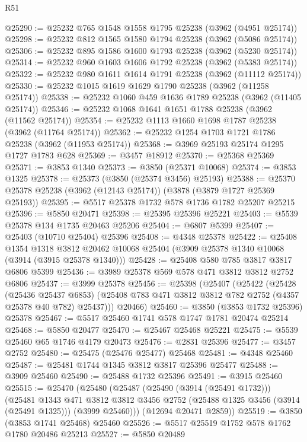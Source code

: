 \begin{lexlean}{R51}
\begin{coremodule}
@25290 := @25232 @765 @1548 @1558 @1795 @25238 (@3962 (@4951 @25174))
@25298 := @25232 @812 @1565 @1580 @1794 @25238 (@3962 (@5086 @25174))
@25306 := @25232 @895 @1586 @1600 @1793 @25238 (@3962 (@5230 @25174))
@25314 := @25232 @960 @1603 @1606 @1792 @25238 (@3962 (@5383 @25174))
@25322 := @25232 @980 @1611 @1614 @1791 @25238 (@3962 (@11112 @25174))
@25330 := @25232 @1015 @1619 @1629 @1790 @25238 (@3962 (@11258 @25174))
@25338 := @25232 @1060 @459 @1636 @1789 @25238 (@3962 (@11405 @25174))
@25346 := @25232 @1068 @1641 @1651 @1788 @25238 (@3962 (@11562 @25174))
@25354 := @25232 @1113 @1660 @1698 @1787 @25238 (@3962 (@11764 @25174))
@25362 := @25232 @1254 @1703 @1721 @1786 @25238 (@3962 (@11953 @25174))
@25368 := @3969 @25193 @25174 @1295 @1727 @1783 @628
@25369 := @3457 @18912
@25370 := @25368 @25369
@25371 := @3853 @1340
@25373 := @3850 (@25371 @10068)
@25374 := @3853 @1325
@25378 := @25373 (@3850 (@25374 @3456) @25193)
@25388 := @25370 @25378 @25238 (@3962 (@12143 @25174)) (@3878 (@3879 @1727 @25369 @25193))
@25395 := @5517 @25378 @1732 @578 @1736 @1782 @25207 @25215
@25396 := @5850 @20471
@25398 := @25395 @25396 @25221
@25403 := @5539 @25378 @134 @1735 @20463 @25206
@25404 := @6807 @5399
@25407 := @25403 (@10710 @25404) @25396
@25408 := @4348 @25378
@25422 := @25408
    @1354
    @1318
    @3812
    @20462
    @10068
    @25404
    (@3909 @25378 @1340 @10068 (@3914 (@3915 @25378 @1340)))
@25428 := @25408 @580 @785 @3817 @3817 @6806 @5399
@25436 := @3989 @25378 @569 @578 @471 @3812 @3812 @2752 @6806
@25437 := @3999 @25378
@25456 := @25398
    (@25407
      (@25422
        (@25428
          (@25436 @25437 @6853)
          (@25408 @783 @471 @3812 @3812 @782 @2752 (@4357 @25378 @40 @782) @25437)))
      @20466)
@25460 := @3850 (@3853 @1732 @25396) @25378
@25467 := @5517 @25460 @1741 @578 @1747 @1781 @20474 @25214
@25468 := @5850 @20477
@25470 := @25467 @25468 @25221
@25475 := @5539 @25460 @65 @1746 @4179 @20473
@25476 := @2831 @25396
@25477 := @3457 @2752
@25480 := @25475 (@25476 @25477) @25468
@25481 := @4348 @25460
@25487 := @25481 @1744 @1345 @3812 @3817 @25396 @25477
@25488 := @3909 @25460
@25490 := @25488 @1732 @25396
@25491 := @3915 @25460
@25515 := @25470
    (@25480
      (@25487
        (@25490 (@3914 (@25491 @1732)))
        (@25481
          @1343
          @471
          @3812
          @3812
          @3456
          @2752
          (@25488 @1325 @3456 (@3914 (@25491 @1325)))
          (@3999 @25460)))
      (@12694 @20471 @2859))
@25519 := @3850 (@3853 @1741 @25468) @25460
@25526 := @5517 @25519 @1752 @578 @1762 @1780 @20486 @25213
@25527 := @5850 @20489

\end{coremodule}
\end{lexlean}
